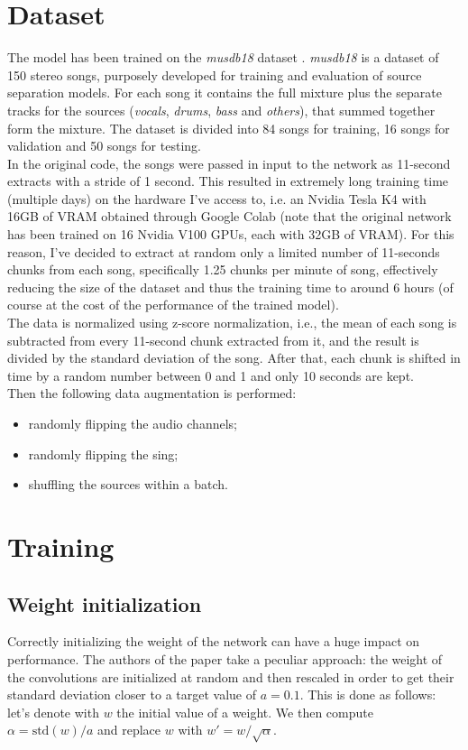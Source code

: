 \documentclass[12pt]{article}
\begin{document}
\newpage
\section{Dataset}\label{sec:data}
The model has been trained on the \textit{musdb18} dataset \cite{musdb18}. \textit{musdb18} is a dataset of 150 stereo songs, purposely developed for training and evaluation of source separation models. For each song it contains the full mixture plus the separate tracks for the sources (\textit{vocals}, \textit{drums}, \textit{bass} and \textit{others}), that summed together form the mixture. The dataset is divided into 84 songs for training, 16 songs for validation and 50 songs for testing.\\
In the original code, the songs were passed in input to the network as 11-second extracts with a stride of 1 second. This resulted in extremely long training time (multiple days) on the hardware I've access to, i.e. an Nvidia Tesla K4 with 16GB of VRAM obtained through Google Colab (note that the original network has been trained on 16 Nvidia V100 GPUs, each with 32GB of VRAM). For this reason, I've decided to extract at random only a limited number of 11-seconds chunks from each song, specifically 1.25 chunks per minute of song, effectively reducing the size of the dataset and thus the training time to around 6 hours (of course at the cost of the performance of the trained model).\\
The data is normalized using z-score normalization, i.e., the mean of each song is subtracted from every 11-second chunk extracted from it, and the result is divided by the standard deviation of the song. After that, each chunk is shifted in time by a random number between 0 and 1 and only 10 seconds are kept.\\
Then the following data augmentation is performed:
\begin{itemize}
\item randomly flipping the audio channels;
\item randomly flipping the sing;
\item shuffling the sources within a batch.
\end{itemize}

 

\newpage
\section{Training}\label{sec:train}
\subsection{Weight initialization}
Correctly initializing the weight of the network can have a huge impact on performance. The authors of the paper take a peculiar approach: the weight of the convolutions are initialized at random and then rescaled in order to get their standard deviation closer to a target value of \(a=0.1\). This is done as follows: let's denote with \(w\) the initial value of a weight. We then compute \(\alpha=\mathrm{std}(w)/a\) and replace \(w\) with \(w'=w/\sqrt\alpha\).
\end{document}
